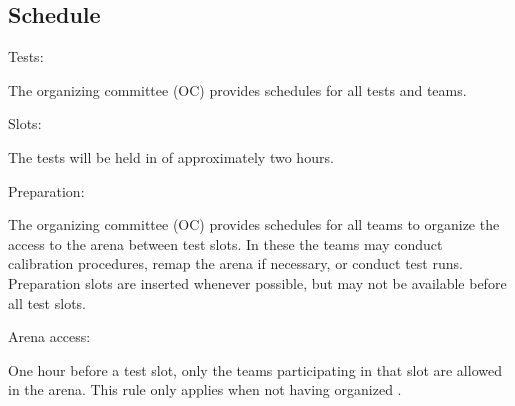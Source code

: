 \subsection{Schedule}\label{rule:schedule}

\begin{enumerate}
{\bf\item Tests:} The organizing committee (OC) provides schedules for all tests and teams. 
{\bf\item Slots:} The tests will be held in  of approximately two hours.  
{\bf\item Preparation:} The organizing committee (OC) provides schedules for all teams to organize the access to the arena between test slots.
In these  the teams may conduct calibration procedures, remap the arena if necessary, or conduct test runs.
Preparation slots are inserted whenever possible, but may not be available before all test slots. 
{\bf\item Arena access:} One hour before a test slot, only the teams participating in that slot are allowed in the arena.
This rule only applies when not having organized .   
\end{enumerate}


